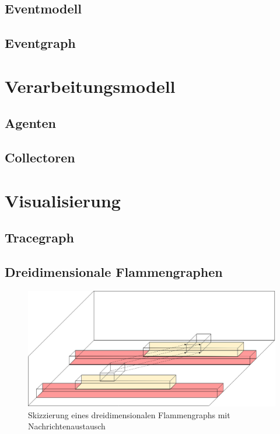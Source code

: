 \subsection{Eventmodell}
\label{subsection:Eventmodell}
\subsection{Eventgraph}
\label{subsection:Eventgraph}
\section{Verarbeitungsmodell}
\label{section:Verarbeitungsmodell}
\subsection{Agenten}
\label{subsection:Agenten}
\subsection{Collectoren}
\label{subsection:Collectoren}

\section{Visualisierung}
\label{section:Visualisierung}

\subsection{Tracegraph}
\subsection{Dreidimensionale Flammengraphen}
\begin{figure}[!ht]
	\centering
	\includegraphics[scale=0.3]{img/Problembeschreibung/flamegraph_3D.png}
	\caption[3D Flammengraph]{Skizzierung eines dreidimensionalen Flammengraphs mit Nachrichtenaustausch}
	\label{fig:flamegraph_3D}
\end{figure}

